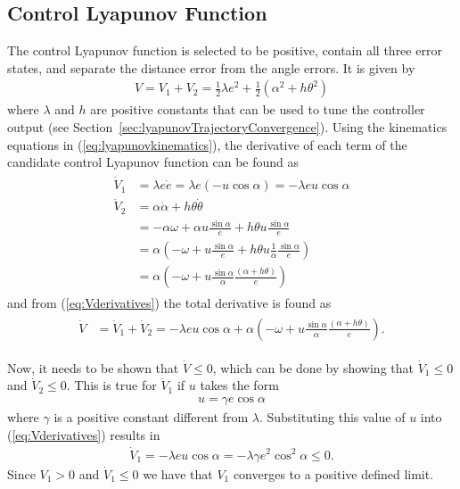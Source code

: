 \subsection{Control Lyapunov Function}%
\label{sec:controllyapunov}
The control Lyapunov function is selected to be positive, contain all three error states, and separate the distance error from the angle errors. It is given by
\begin{align}
\label{eq:lyapunovfunction}
V = V_1 + V_2 = \frac{1}{2}\lambda e^2 + \frac{1}{2}\left(\alpha^2+h\theta^2\right)
\end{align}
where $\lambda$ and $h$ are positive constants that can be used to tune the controller output (see Section~\ref{sec:lyapunovTrajectoryConvergence}). Using the kinematics equations in (\ref{eq:lyapunovkinematics}), the derivative of each term of the candidate control Lyapunov function can be found as
\begin{align}
\label{eq:Vderivatives}
\begin{split}
\dot{V}_1 &= \lambda e\dot{e} = \lambda e (-u\cos\alpha) = -\lambda eu\cos\alpha \\
\dot{V}_2 &= \alpha\dot{\alpha}+h\theta\dot{\theta} \\
&= -\alpha\omega + \alpha u\frac{\sin\alpha}{e} + h\theta u\frac{\sin\alpha}{e} \\
&= \alpha\left(-\omega + u\frac{\sin\alpha}{e} + h\theta u\frac{1}{\alpha}\frac{\sin\alpha}{e}\right) \\
&= \alpha\left(-\omega + u\frac{\sin\alpha}{\alpha}\frac{(\alpha+h\theta)}{e}\right)
\end{split}
\end{align}
and from (\ref{eq:Vderivatives}) the total derivative is found as
\begin{align}
\label{eq:lyapunovfunctionderivative}
\begin{split}
\dot{V} &= \dot{V}_1 + \dot{V}_2 = -\lambda e u\cos\alpha + \alpha\left(-\omega+u\frac{\sin\alpha}{\alpha}\frac{(\alpha+h\theta)}{e}\right).
\end{split}
\end{align}

Now, it needs to be shown that $\dot{V}\leq0$, which can be done by showing that $\dot{V}_1\leq0$ and $\dot{V}_2\leq0$. This is true for $\dot{V}_1$ if $u$ takes the form
\begin{align}
\label{eq:lyapunovu}
u = \gamma e\cos\alpha
\end{align}
where $\gamma$ is a positive constant different from $\lambda$. Substituting this value of $u$ into (\ref{eq:Vderivatives}) results in
\begin{align}
\label{eq:V1dotfinal}
\dot{V}_1 = -\lambda eu\cos\alpha = -\lambda\gamma e^2\cos^2\alpha \leq 0.
\end{align}
Since $V_1>0$ and $\dot{V}_1\leq0$ we have that $V_1$ converges to a positive defined limit.

